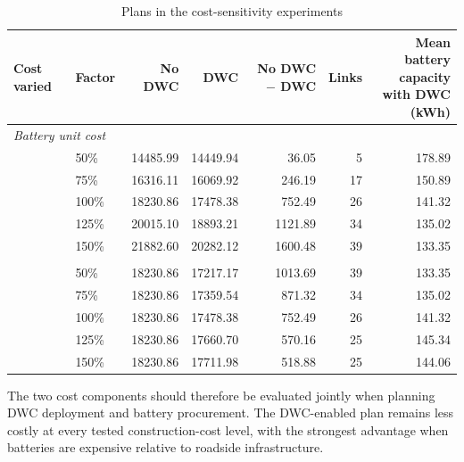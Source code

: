 \begin{table}[!htbp]
\centering
\footnotesize
\setlength{\tabcolsep}{3.7pt}
\caption{Plans in the cost-sensitivity experiments}
\label{tab:planning-cost-sensitivity}
\begin{tabular*}{\linewidth}{@{\extracolsep{\fill}}llrrrrr@{}}
\toprule
Cost varied & Factor & No DWC & DWC & No DWC $-$ DWC & Links & \shortstack{Mean battery\\capacity with DWC\\(kWh)} \\
\midrule
\multicolumn{7}{l}{\textit{Battery unit cost}} \\
& 50\%  & 14485.99 & 14449.94 & 36.05   & 5  & 178.89 \\
& 75\%  & 16316.11 & 16069.92 & 246.19  & 17 & 150.89 \\
& 100\% & 18230.86 & 17478.38 & 752.49  & 26 & 141.32 \\
& 125\% & 20015.10 & 18893.21 & 1121.89 & 34 & 135.02 \\
& 150\% & 21882.60 & 20282.12 & 1600.48 & 39 & 133.35 \\
\addlinespace
\multicolumn{7}{l}{\textit{DWC construction cost}} \\
& 50\%  & 18230.86 & 17217.17 & 1013.69 & 39 & 133.35 \\
& 75\%  & 18230.86 & 17359.54 & 871.32  & 34 & 135.02 \\
& 100\% & 18230.86 & 17478.38 & 752.49  & 26 & 141.32 \\
& 125\% & 18230.86 & 17660.70 & 570.16  & 25 & 145.34 \\
& 150\% & 18230.86 & 17711.98 & 518.88  & 25 & 144.06 \\
\bottomrule
\end{tabular*}
\end{table}

The two cost components should therefore be evaluated jointly when planning DWC deployment and battery procurement.
The DWC-enabled plan remains less costly at every tested construction-cost level, with the strongest advantage when batteries are expensive relative to roadside infrastructure.
\FloatBarrier
